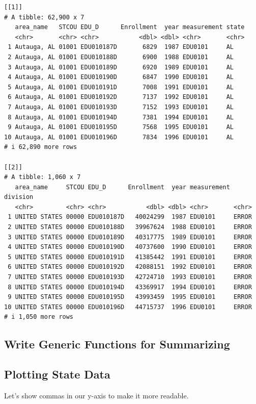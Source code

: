 \documentclass[
  letterpaper,
  DIV=11,
  numbers=noendperiod]{scrartcl}
\begin{document}
\begin{verbatim}
[[1]]
# A tibble: 62,900 x 7
   area_name   STCOU EDU_D      Enrollment  year measurement state
   <chr>       <chr> <chr>           <dbl> <dbl> <chr>       <chr>
 1 Autauga, AL 01001 EDU010187D       6829  1987 EDU0101     AL   
 2 Autauga, AL 01001 EDU010188D       6900  1988 EDU0101     AL   
 3 Autauga, AL 01001 EDU010189D       6920  1989 EDU0101     AL   
 4 Autauga, AL 01001 EDU010190D       6847  1990 EDU0101     AL   
 5 Autauga, AL 01001 EDU010191D       7008  1991 EDU0101     AL   
 6 Autauga, AL 01001 EDU010192D       7137  1992 EDU0101     AL   
 7 Autauga, AL 01001 EDU010193D       7152  1993 EDU0101     AL   
 8 Autauga, AL 01001 EDU010194D       7381  1994 EDU0101     AL   
 9 Autauga, AL 01001 EDU010195D       7568  1995 EDU0101     AL   
10 Autauga, AL 01001 EDU010196D       7834  1996 EDU0101     AL   
# i 62,890 more rows

[[2]]
# A tibble: 1,060 x 7
   area_name     STCOU EDU_D      Enrollment  year measurement division
   <chr>         <chr> <chr>           <dbl> <dbl> <chr>       <chr>   
 1 UNITED STATES 00000 EDU010187D   40024299  1987 EDU0101     ERROR   
 2 UNITED STATES 00000 EDU010188D   39967624  1988 EDU0101     ERROR   
 3 UNITED STATES 00000 EDU010189D   40317775  1989 EDU0101     ERROR   
 4 UNITED STATES 00000 EDU010190D   40737600  1990 EDU0101     ERROR   
 5 UNITED STATES 00000 EDU010191D   41385442  1991 EDU0101     ERROR   
 6 UNITED STATES 00000 EDU010192D   42088151  1992 EDU0101     ERROR   
 7 UNITED STATES 00000 EDU010193D   42724710  1993 EDU0101     ERROR   
 8 UNITED STATES 00000 EDU010194D   43369917  1994 EDU0101     ERROR   
 9 UNITED STATES 00000 EDU010195D   43993459  1995 EDU0101     ERROR   
10 UNITED STATES 00000 EDU010196D   44715737  1996 EDU0101     ERROR   
# i 1,050 more rows
\end{verbatim}

\subsection{Write Generic Functions for
Summarizing}\label{write-generic-functions-for-summarizing}

\subsection{Plotting State Data}\label{plotting-state-data}

Let's show commas in our y-axis to make it more readable.
\end{document}
